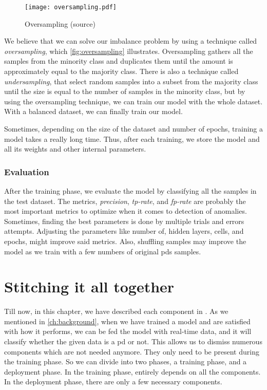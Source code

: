 \begin{figure}[ht]
    \centering
    \texttt{[image: oversampling.pdf]}
    \caption{Oversampling (source\cite{tw_imbalance})}
    \label{fig:oversampling}
\end{figure}

We believe that we can solve our imbalance problem by using a technique called \emph{oversampling}, which \autoref{fig:oversampling} illustrates. Oversampling gathers all the samples from the minority class and duplicates them until the amount is approximately equal to the majority class. There is also a technique called \emph{undersampling}, that select random samples into a subset from the majority class until the size is equal to the number of samples in the minority class, but by using the oversampling technique, we can train our model with the whole dataset. With a balanced dataset, we can finally train our model.

Sometimes, depending on the size of the dataset and number of epochs, training a model takes a really long time. Thus, after each training, we store the model and all its weights and other internal parameters.

\subsubsection{Evaluation}
After the training phase, we evaluate the model by classifying all the samples in the test dataset. The metrics, \emph{precision}, \emph{tp-rate}, and \emph{fp-rate} are probably the most important metrics to optimize when it comes to detection of anomalies. Sometimes, finding the best parameters is done by multiple trials and errors attempts. Adjusting the parameters like number of, hidden layers, cells, and epochs, might improve said metrics. Also, shuffling samples may improve the model as we train with a few numbers of original \acp{pd} samples.

\section{Stitching it all together}
Till now, in this chapter, we have described each component in \project. As we mentioned in \autoref{ch:background}, when we have trained a model and are satisfied with how it performs, we can be fed the model with real-time data, and it will classify whether the given data is a \ac{pd} or not. This allows us to dismiss numerous components which are not needed anymore. They only need to be present during the training phase. So we can divide \project into two phases, a training phase, and a deployment phase. In the training phase, \project entirely depends on all the components. In the deployment phase, there are only a few necessary components.

